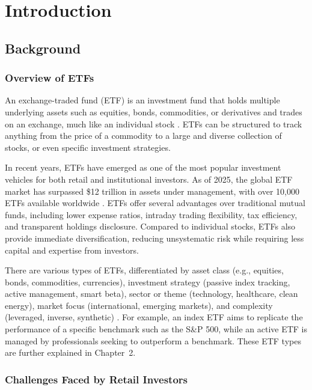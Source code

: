 \chapter{Introduction}
\section{Background}

\subsection{Overview of ETFs}

An exchange-traded fund (ETF) is an investment fund that holds multiple underlying assets such as equities, bonds, commodities, or derivatives and trades on an exchange, much like an individual stock \cite{chen2025, blackrock}. ETFs can be structured to track anything from the price of a commodity to a large and diverse collection of stocks, or even specific investment strategies.

In recent years, ETFs have emerged as one of the most popular investment vehicles for both retail and institutional investors. As of 2025, the global ETF market has surpassed \$12 trillion in assets under management, with over 10,000 ETFs available worldwide \cite{morgan_etf}. ETFs offer several advantages over traditional mutual funds, including lower expense ratios, intraday trading flexibility, tax efficiency, and transparent holdings disclosure. Compared to individual stocks, ETFs also provide immediate diversification, reducing unsystematic risk while requiring less capital and expertise from investors.

There are various types of ETFs, differentiated by asset class (e.g., equities, bonds, commodities, currencies), investment strategy (passive index tracking, active management, smart beta), sector or theme (technology, healthcare, clean energy), market focus (international, emerging markets), and complexity (leveraged, inverse, synthetic) \cite{chen2025}. For example, an index ETF aims to replicate the performance of a specific benchmark such as the S\&P 500, while an active ETF is managed by professionals seeking to outperform a benchmark. These ETF types are further explained in Chapter~2.

\subsection{Challenges Faced by Retail Investors}

